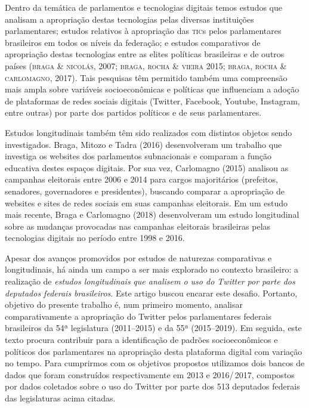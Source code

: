 Dentro da temática de parlamentos e tecnologias digitais temos estudos
que analisam a apropriação destas tecnologias pelas diversas
instituições parlamentares; estudos relativos à apropriação das \textsc{tic}s
pelos parlamentares brasileiros em todos os níveis da federação; e
estudos comparativos de apropriação destas tecnologias entre as elites
políticas brasileiras e de outros países (\textsc{braga \& nicolás}, 2007; \textsc{braga,
rocha \& vieira} 2015; \textsc{braga, rocha \& carlomagno}, 2017). Tais pesquisas
têm permitido também uma compreensão mais ampla sobre variáveis
socioeconômicas e políticas que influenciam a adoção de plataformas de
redes sociais digitais (Twitter, Facebook, Youtube, Instagram, entre
outras) por parte dos partidos políticos e de seus parlamentares.

Estudos longitudinais também têm sido realizados com distintos objetos
sendo investigados. Braga, Mitozo e Tadra (2016) desenvolveram um
trabalho que investiga os websites dos parlamentos subnacionais e
comparam a função educativa destes espaços digitais. Por sua vez,
Carlomagno (2015) analisou as campanhas eleitorais entre 2006 e 2014
para cargos majoritários (prefeitos, senadores, governadores e
presidentes), buscando comparar a apropriação de websites e sites de
redes sociais em suas campanhas eleitorais. Em um estudo mais recente,
Braga e Carlomagno (2018) desenvolveram um estudo longitudinal sobre as
mudanças provocadas nas campanhas eleitorais brasileiras pelas
tecnologias digitais no período entre 1998 e 2016.

Apesar dos avanços promovidos por estudos de naturezas comparativas e
longitudinais, há ainda um campo a ser mais explorado no contexto
brasileiro: a realização de \emph{estudos longitudinais} \emph{que
analisem o uso do Twitter por parte dos deputados federais brasileiros}.
Este artigo buscou encarar este desafio. Portanto, objetivo do presente
trabalho é, num primeiro momento, analisar comparativamente a
apropriação do Twitter pelos parlamentares federais brasileiros da 54ª
legislatura (2011--2015) e da 55ª (2015--2019). Em seguida, este texto
procura contribuir para a identificação de padrões socioeconômicos e
políticos dos parlamentares na apropriação desta plataforma digital com
variação no tempo. Para cumprirmos com os objetivos propostos utilizamos
dois bancos de dados que foram construídos respectivamente em 2013 e
2016/\,2017, compostos por dados coletados sobre o uso do Twitter por
parte dos 513 deputados federais das legislaturas acima citadas.

